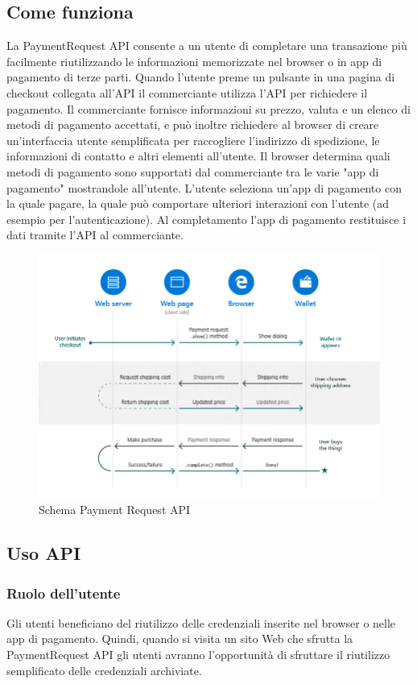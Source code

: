 \documentclass[11pt ,a4paper , twoside , openright ]{article}
\begin{document}
	\subsection{Come funziona}	
	La PaymentRequest API consente a un utente di completare una transazione più facilmente riutilizzando le informazioni memorizzate nel browser o in app di pagamento di terze parti.
	Quando l'utente preme un pulsante in una pagina di checkout collegata all'API il commerciante utilizza l'API per richiedere il pagamento. Il commerciante fornisce informazioni su prezzo, valuta e un elenco di metodi di pagamento accettati, e può inoltre richiedere al browser di creare un'interfaccia utente semplificata per raccogliere l'indirizzo di spedizione, le informazioni di contatto e altri elementi all'utente.
	Il browser determina quali metodi di pagamento sono supportati dal commerciante tra le varie "app di pagamento" mostrandole all'utente. 
	L'utente seleziona un'app di pagamento con la quale pagare, la quale può comportare ulteriori interazioni con l'utente (ad esempio per l'autenticazione). 
	Al completamento l'app di pagamento restituisce i dati tramite l'API al commerciante.

	\begin{figure}[h]
		\centering
		\includegraphics[width=1\linewidth]{SchemaPayment}
		\caption{Schema Payment Request API}
		\label{fig:Schema Payment}
	\end{figure}
	\pagebreak
	
	\subsection{Uso API}
	\subsubsection{Ruolo dell'utente}
	Gli utenti beneficiano del riutilizzo delle credenziali inserite nel browser o nelle app di pagamento. Quindi, quando si visita un sito Web che sfrutta la PaymentRequest API gli utenti avranno l'opportunità di sfruttare il riutilizzo semplificato delle credenziali archiviate.
\end{document}
